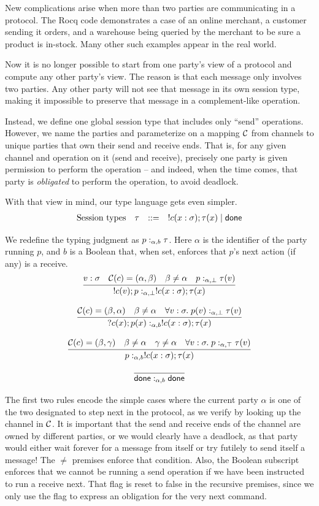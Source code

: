 \documentclass{amsbook}
\theoremstyle{definition}
\theoremstyle{remark}
\numberwithin{section}{chapter}
\numberwithin{equation}{chapter}
\begin{document}
New complications arise when more than two parties are communicating in a protocol.
The Rocq code demonstrates a case of an online merchant, a customer sending it orders, and a warehouse being queried by the merchant to be sure a product is in-stock.
Many other such examples appear in the real world.

Now it is no longer possible to start from one party's view of a protocol and compute any other party's view.
The reason is that each message only involves two parties.
Any other party will not see that message in its own session type, making it impossible to preserve that message in a complement-like operation.

Instead, we define one global session type that includes only ``send'' operations.
However, we name the parties and parameterize on a mapping $\mathcal C$ from channels to unique parties that own their send and receive ends.
That is, for any given channel and operation on it (send and receive), precisely one party is given permission to perform the operation -- and indeed, when the time comes, that party is \emph{obligated} to perform the operation, to avoid deadlock.

With that view in mind, our type language gets even simpler.
$$\begin{array}{rrcl}
  \textrm{Session types} & \tau &::=& !c(x : \sigma); \tau(x) \mid \mathsf{done}
\end{array}$$

We redefine the typing judgment as $p :_{\alpha,b} \tau$.
Here $\alpha$ is the identifier of the party running $p$, and $b$ is a Boolean that, when set, enforces that $p$'s next action (if any) is a receive.
$$\infer{\mpty{\send{c}{v}{p}}{\alpha}{\bot}{\send{c}{x : \sigma}{\tau(x)}}}{
  v : \sigma
  & \channels(c) = (\alpha, \beta)
  & \beta \neq \alpha
  & \mpty{p}{\alpha}{\bot}{\tau(v)}
}$$

$$\infer{\mpty{\recv{c}{x}{p(x)}}{\alpha}{b}{\send{c}{x : \sigma}{\tau(x)}}}{
  \channels(c) = (\beta, \alpha)
  & \beta \neq \alpha
  & \forall v : \sigma. \; \mpty{p(v)}{\alpha}{\bot}{\tau(v)}
}$$

$$\infer{\mpty{p}{\alpha}{b}{\send{c}{x : \sigma}{\tau(x)}}}{
  \channels(c) = (\beta, \gamma)
  & \beta \neq \alpha
  & \gamma \neq \alpha
  & \forall v : \sigma. \; \mpty{p}{\alpha}{\top}{\tau(v)}
}$$

$$\infer{\mpty{\done}{\alpha}{b}{\done}}{}$$

The first two rules encode the simple cases where the current party $\alpha$ is one of the two designated to step next in the protocol, as we verify by looking up the channel in $\mathcal C$.
It is important that the send and receive ends of the channel are owned by different parties, or we would clearly have a deadlock, as that party would either wait forever for a message from itself or try futilely to send itself a message!
The $\neq$ premises enforce that condition.
Also, the Boolean subscript enforces that we cannot be running a send operation if we have been instructed to run a receive next.
That flag is reset to false in the recursive premises, since we only use the flag to express an obligation for the very next command.
\end{document}
